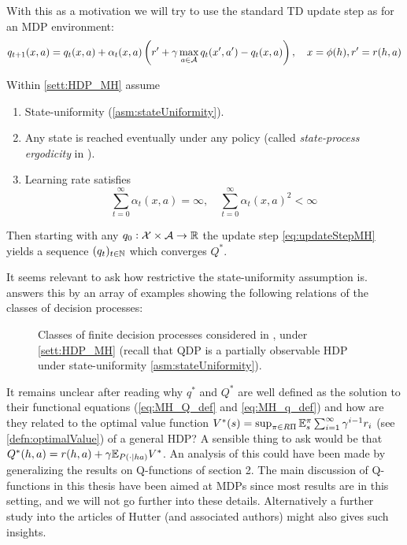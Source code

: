 With this as a motivation we will try to use
the standard TD update step as for an MDP environment:
\begin{equation}
  q_{t+1}(x, a) = q_t(x, a) + \alpha_t(x, a)
  \left(r' + \gamma \max_{a \in \mathcal{A}} q_t(x', a') - q_t(x, a)\right),
  \quad x = \phi(h), r' = r(h,a)
  \label{eq:updateStepMH}
\end{equation}

\begin{thm}
  Within \cref{sett:HDP_MH} assume
  \begin{enumerate}
    \item State-uniformity (\cref{asm:stateUniformity}).
    \item Any state is reached eventually under any policy
      (called \emph{state-process ergodicity} in ).
    \item Learning rate satisfies
      \[ \sum_{t=0}^\infty \alpha_t(x, a) = \infty, \quad
      \sum_{t=0}^\infty \alpha_t(x, a)^2 < \infty \]
  \end{enumerate}
  Then starting with any $q_0 : \mathcal{X} \times \mathcal{A} \to \mathbb{R}$
  the update step \cref{eq:updateStepMH} yields a sequence
  $(q_t)_{t \in \mathbb{N}}$ which converges $Q^*$.
\end{thm}

It seems relevant to ask how restrictive the state-uniformity assumption is.
 answers this by an array of examples showing the following
relations of the classes of decision processes:

\begin{figure}[H]
  \centering
  \caption{Classes of finite decision processes considered in ,
    under \cref{sett:HDP_MH}
    (recall that QDP is a partially observable HDP under state-uniformity
    \cref{asm:stateUniformity}).
  }
  \label{fig:DPMH}
\end{figure}

\begin{rem}
 It remains unclear after reading 
why $q^*$ and $Q^*$ are well defined as the solution to their
functional equations (\cref{eq:MH_Q_def} and \cref{eq:MH_q_def})
and how are they related to the optimal value function
$V^*(s) = \sup_{\pi \in R\Pi} \mathbb{E}_s^\pi
\sum_{i=1}^\infty \gamma^{i-1} r_i $
(see \cref{defn:optimalValue})
of a general HDP?
A sensible thing to ask would be that
$Q^*(h, a) = r(h, a) + \gamma \mathbb{E}_{P(\cdot \mid h a)} V^*$.
An analysis of this could have been made by generalizing the results
on Q-functions of section 2.
The main discussion of Q-functions in this thesis have been aimed at
MDPs since most results are in this setting,
and we will not go further into these details.
Alternatively a further study into the articles of Hutter
(and associated authors) might also gives such insights. 
\end{rem}

